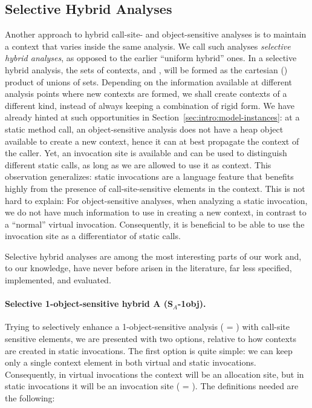 \subsection{Selective Hybrid Analyses}

Another approach to hybrid call-site- and object-sensitive analyses is to maintain a context that varies inside the same analysis. We call such analyses \emph{selective hybrid analyses}, as opposed to the earlier ``uniform hybrid'' ones. In a selective hybrid analysis, the sets of contexts,  and , will be formed as the cartesian (\todo{}) product of unions of sets. Depending on the information available at different analysis points where new contexts are formed, we shall create contexts of a different kind, instead of always keeping a combination of rigid form. We have already hinted at such opportunities in Section~\ref{sec:intro:model-instances}: at a static method call, an object-sensitive analysis does not have a heap object available to create a new context, hence it can at best propagate the context of the caller. Yet, an invocation site is available and can be used to distinguish different static calls, as long as we are allowed to use it as context. This observation generalizes: static invocations are a language feature that benefits highly from the presence of call-site-sensitive elements in the context. This is not hard to explain: For object-sensitive analyses, when analyzing a static invocation, we do not have much information to use in creating a new context, in contrast to a ``normal'' virtual invocation. Consequently, it is beneficial to be able to use the invocation site as a differentiator of static calls.

Selective hybrid analyses are among the most interesting parts of our work and, to our knowledge, have never before arisen in the literature, far less specified, implemented, and evaluated.

\paragraph[Selective 1-object-sensitive (-A)]{Selective 1-object-sensitive hybrid A (S$_A$-1obj).}
Trying to selectively enhance a 1-object-sensitive analysis ( = \args{\{$\star$\}}) with call-site sensitive elements, we are presented with two options, relative to how contexts are created in static invocations. The first option is quite simple: we can keep only a single context element in both virtual and static invocations. Consequently, in virtual invocations the context will be an allocation site, but in static invocations it will be an invocation site ( = ). The definitions needed are the following:

